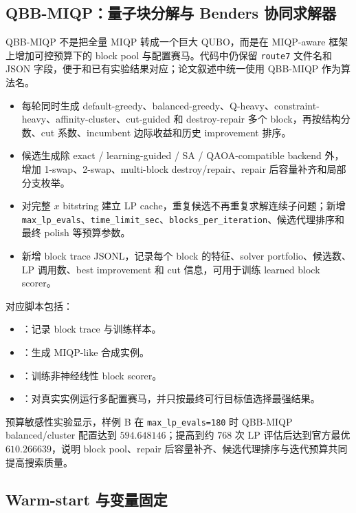 \documentclass[UTF8,a4paper,11pt]{ctexart}
\begin{document}
\subsection{QBB-MIQP：量子块分解与 Benders 协同求解器}

QBB-MIQP 不是把全量 MIQP 转成一个巨大 QUBO，而是在 MIQP-aware 框架上增加可控预算下的 block pool 与配置赛马。代码中仍保留 \texttt{route7} 文件名和 JSON 字段，便于和已有实验结果对应；论文叙述中统一使用 QBB-MIQP 作为算法名。

\begin{itemize}
  \item 每轮同时生成 default-greedy、balanced-greedy、Q-heavy、constraint-heavy、affinity-cluster、cut-guided 和 destroy-repair 多个 block，再按结构分数、cut 系数、incumbent 边际收益和历史 improvement 排序。
  \item 候选生成除 exact / learning-guided / SA / QAOA-compatible backend 外，增加 1-swap、2-swap、multi-block destroy/repair、repair 后容量补齐和局部分支枚举。
  \item 对完整 $x$ bitstring 建立 LP cache，重复候选不再重复求解连续子问题；新增 \texttt{max\_lp\_evals}、\texttt{time\_limit\_sec}、\texttt{blocks\_per\_iteration}、候选代理排序和最终 polish 等预算参数。
  \item 新增 block trace JSONL，记录每个 block 的特征、solver portfolio、候选数、LP 调用数、best improvement 和 cut 信息，可用于训练 learned block scorer。
\end{itemize}

对应脚本包括：
\begin{itemize}
  \item {}：记录 block trace 与训练样本。
  \item {}：生成 MIQP-like 合成实例。
  \item {}：训练非神经线性 block scorer。
  \item {}：对真实实例运行多配置赛马，并只按最终可行目标值选择最强结果。
\end{itemize}

预算敏感性实验显示，样例 B 在 \texttt{max\_lp\_evals=180} 时 QBB-MIQP balanced/cluster 配置达到 $594.648146$；提高到约 $768$ 次 LP 评估后达到官方最优 $610.266639$，说明 block pool、repair 后容量补齐、候选代理排序与迭代预算共同提高搜索质量。

\subsection{Warm-start 与变量固定}
\end{document}
